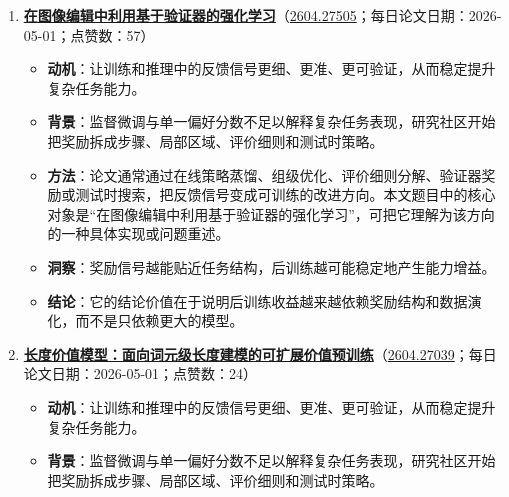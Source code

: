 \begin{enumerate}[leftmargin=1.5em]
\begin{itemize}[leftmargin=1.5em]
    \item \textbf{背景}：监督微调与单一偏好分数不足以解释复杂任务表现，研究社区开始把奖励拆成步骤、局部区域、评价细则和测试时策略。
    \item \textbf{方法}：论文通常通过在线策略蒸馏、组级优化、评价细则分解、验证器奖励或测试时搜索，把反馈信号变成可训练的改进方向。本文题目中的核心对象是“协同演化的策略蒸馏”，可把它理解为该方向的一种具体实现或问题重述。
    \item \textbf{洞察}：奖励信号越能贴近任务结构，后训练越可能稳定地产生能力增益。
    \item \textbf{结论}：它的结论价值在于说明后训练收益越来越依赖奖励结构和数据演化，而不是只依赖更大的模型。
  \end{itemize}
  \item \textbf{\href{https://huggingface.co/papers/2604.27505}{在图像编辑中利用基于验证器的强化学习}}（\href{https://arxiv.org/abs/2604.27505}{2604.27505}；每日论文日期：2026-05-01；点赞数：57）
  \begin{itemize}[leftmargin=1.5em]
    \item \textbf{动机}：让训练和推理中的反馈信号更细、更准、更可验证，从而稳定提升复杂任务能力。
    \item \textbf{背景}：监督微调与单一偏好分数不足以解释复杂任务表现，研究社区开始把奖励拆成步骤、局部区域、评价细则和测试时策略。
    \item \textbf{方法}：论文通常通过在线策略蒸馏、组级优化、评价细则分解、验证器奖励或测试时搜索，把反馈信号变成可训练的改进方向。本文题目中的核心对象是“在图像编辑中利用基于验证器的强化学习”，可把它理解为该方向的一种具体实现或问题重述。
    \item \textbf{洞察}：奖励信号越能贴近任务结构，后训练越可能稳定地产生能力增益。
    \item \textbf{结论}：它的结论价值在于说明后训练收益越来越依赖奖励结构和数据演化，而不是只依赖更大的模型。
  \end{itemize}
  \item \textbf{\href{https://huggingface.co/papers/2604.27039}{长度价值模型：面向词元级长度建模的可扩展价值预训练}}（\href{https://arxiv.org/abs/2604.27039}{2604.27039}；每日论文日期：2026-05-01；点赞数：24）
  \begin{itemize}[leftmargin=1.5em]
    \item \textbf{动机}：让训练和推理中的反馈信号更细、更准、更可验证，从而稳定提升复杂任务能力。
    \item \textbf{背景}：监督微调与单一偏好分数不足以解释复杂任务表现，研究社区开始把奖励拆成步骤、局部区域、评价细则和测试时策略。

\end{itemize}
\end{enumerate}
